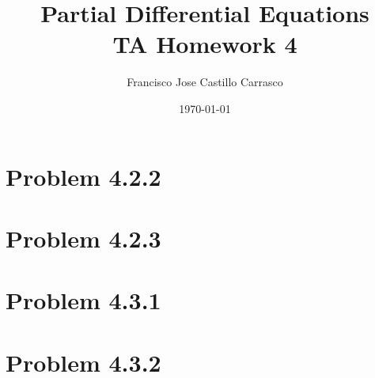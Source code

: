 




\title{Partial Differential Equations\\TA Homework 4}
\author{Francisco Jose Castillo Carrasco}
\date{\today}
\maketitle




\section*{Problem 4.2.2}

\newpage
\section*{Problem 4.2.3}

\newpage
\section*{Problem 4.3.1}


\section*{Problem 4.3.2}



